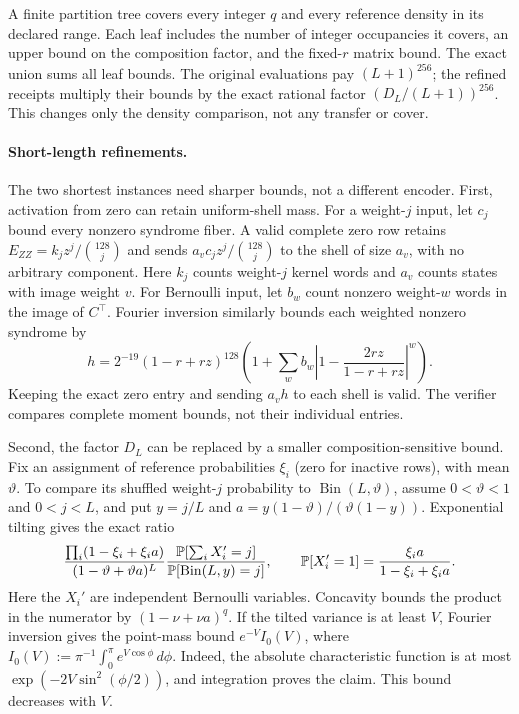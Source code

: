 A finite partition tree covers every integer $q$ and every reference density
in its declared range. Each leaf includes the number of integer occupancies
it covers, an upper bound on the composition factor, and the fixed-$r$
matrix bound. The exact union sums all leaf bounds.
The original evaluations pay $(L+1)^{256}$; the refined receipts multiply
their bounds by the exact rational factor $(D_L/(L+1))^{256}$.
This changes only the density comparison, not any transfer or cover.

\paragraph{Short-length refinements.}
The two shortest instances need sharper bounds, not a different encoder.
First, activation from zero can retain uniform-shell mass. For a
weight-$j$ input, let $c_j$ bound every nonzero syndrome fiber. A valid
complete zero row retains $E_{ZZ}=k_jz^j/\binom{128}{j}$ and sends
$a_vc_jz^j/\binom{128}{j}$ to the shell of size $a_v$, with no arbitrary
component. Here $k_j$ counts weight-$j$ kernel words and $a_v$ counts
states with image weight $v$. For Bernoulli input, let $b_w$ count
nonzero weight-$w$ words in the image of $C^\top$.
Fourier inversion similarly bounds each
weighted nonzero syndrome by
\[
 h=2^{-19}(1-r+rz)^{128}
 \left(1+\sum_w b_w\left|1-\frac{2rz}{1-r+rz}\right|^w\right).
\]
Keeping the exact zero entry and sending $a_vh$ to each shell is valid.
The verifier compares complete moment bounds, not their individual entries.

Second, the factor $D_L$ can be replaced by a smaller
composition-sensitive bound. Fix an assignment of reference probabilities
$\xi_i$ (zero for inactive rows), with mean $\vartheta$. To compare its
shuffled weight-$j$ probability to $\operatorname{Bin}(L,\vartheta)$,
assume $0<\vartheta<1$ and $0<j<L$, and put
$y=j/L$ and $a=y(1-\vartheta)/(\vartheta(1-y))$.
Exponential tilting gives the exact ratio
\[
 \frac{\prod_i(1-\xi_i+\xi_i a)}
      {(1-\vartheta+\vartheta a)^L}
 \frac{\mathbb P[\sum_i X_i'=j]}{\mathbb P[\operatorname{Bin}(L,y)=j]},
 \qquad
 \mathbb P[X_i'=1]=\frac{\xi_i a}{1-\xi_i+\xi_i a}.
\]
Here the $X_i'$ are independent Bernoulli variables.
Concavity bounds the product in the numerator by
$(1-\nu+\nu a)^q$. If the tilted variance is at least $V$, Fourier
inversion gives the point-mass bound $e^{-V}I_0(V)$, where
$I_0(V):=\pi^{-1}\int_0^\pi e^{V\cos\phi}\,d\phi$.
Indeed, the absolute
characteristic function is at most
$\exp(-2V\sin^2(\phi/2))$, and integration proves the claim.
This bound decreases with $V$.

